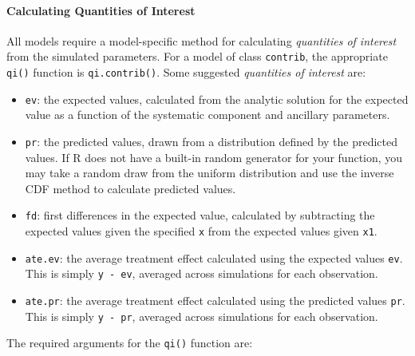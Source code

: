 \paragraph{Calculating Quantities of Interest}

All models require a model-specific method for calculating \emph{quantities of interest} from the simulated parameters.  For a model of class {\tt  contrib}, the appropriate {\tt qi()} function is {\tt  qi.contrib()}.  Some suggested \emph{quantities of interest} are:

\begin{itemize}

	\item {\tt ev}:  the expected values, calculated from the analytic solution for the expected value as a function of the systematic component and ancillary parameters.

	\item {\tt pr}:  the predicted values, drawn from a distribution defined by the predicted values.  If R does not have a built-in random generator for your function, you may take a random draw from the uniform distribution and use the inverse CDF method to calculate predicted values.  

	\item {\tt fd}: first differences in the expected value, calculated by subtracting the expected values given the specified {\tt x} from the expected values given {\tt x1}.

	\item {\tt ate.ev}: the average treatment effect calculated using the expected values {\tt ev}.  This is simply {\tt y - ev}, averaged across simulations for each observation.  

	\item {\tt ate.pr}:  the average treatment effect calculated using the predicted values {\tt pr}.  This is simply {\tt y - pr}, averaged across simulations for each observation.

\end{itemize}


The required arguments for the {\tt qi()} function are:  

